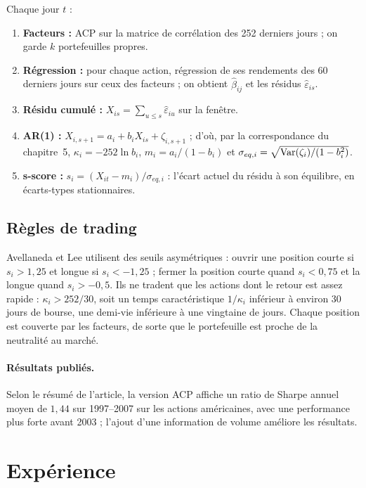 Chaque jour $t$ :
\begin{enumerate}
\item \textbf{Facteurs :} ACP sur la matrice de corrélation des 252 derniers jours ; on garde $k$ portefeuilles propres.
\item \textbf{Régression :} pour chaque action, régression de ses rendements des 60 derniers jours sur ceux des facteurs ; on obtient $\hat\beta_{ij}$ et les résidus $\hat\varepsilon_{is}$.
\item \textbf{Résidu cumulé :} $X_{is} = \sum_{u\le s}\hat\varepsilon_{iu}$ sur la fenêtre.
\item \textbf{AR(1) :} $X_{i,s+1} = a_i + b_iX_{is} + \zeta_{i,s+1}$ ; d'où, par la correspondance du chapitre~5, $\kappa_i = -252\ln b_i$, $m_i = a_i/(1-b_i)$ et $\sigma_{eq,i} = \sqrt{\operatorname{Var}(\zeta_i)/(1-b_i^2)}$.
\item \textbf{s-score :} $s_i = (X_{it} - m_i)/\sigma_{eq,i}$ : l'écart actuel du résidu à son équilibre, en écarts-types stationnaires.
\end{enumerate}

\subsection{Règles de trading}

Avellaneda et Lee utilisent des seuils asymétriques : ouvrir une position courte si $s_i > 1{,}25$ et longue si $s_i < -1{,}25$ ; fermer la position courte quand $s_i < 0{,}75$ et la longue quand $s_i > -0{,}5$. Ils ne tradent que les actions dont le retour est assez rapide : $\kappa_i > 252/30$, soit un temps caractéristique $1/\kappa_i$ inférieur à environ 30 jours de bourse, une demi-vie inférieure à une vingtaine de jours. Chaque position est couverte par les facteurs, de sorte que le portefeuille est proche de la neutralité au marché.

\paragraph{Résultats publiés.} Selon le résumé de l'article, la version ACP affiche un ratio de Sharpe annuel moyen de $1{,}44$ sur 1997–2007 sur les actions américaines, avec une performance plus forte avant 2003 ; l'ajout d'une information de volume améliore les résultats.

\section{Expérience}

